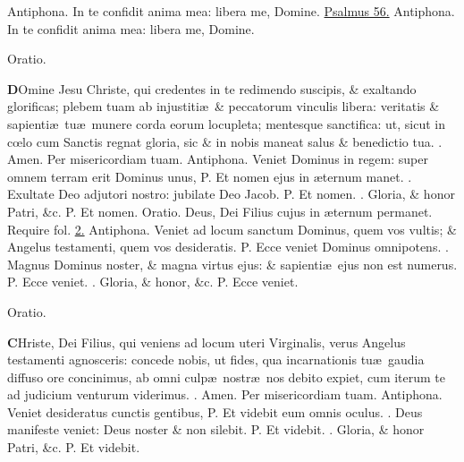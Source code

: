 \documentclass[letter,11pt]{book}
\makeatletter
\DeclareRobustCommand{\Vbar}{\vers@resp{-0.1em}{V}}
\DeclareRobustCommand{\Rbar}{\vers@resp{0pt}{R}}
\newcommand{\vers@resp@sym}{\raisebox{0.2ex}{\rotatebox[origin=c]{-20}{$\m@th\rceil$}}}
\newcommand{\vers@resp}[2]{%
  {\ooalign{\hidewidth\kern#1\vers@resp@sym\hidewidth\cr#2\cr}}%
}%
\def\P{\color{Red} P. \color{black}}
\def\V{\color{Red} \Vbar . \color{black}}
\def\R{\color{Red} \Rbar . \color{black}}
\makeatother
\begin{document}
\begin{multicols}{2}
\newline \color{Red} Antiphona. \color{black} In te confidit anima mea: libera me, Domine. \color{Red} \hyperlink{ps56}{Psalmus 56.} \color{black}
\newline \color{Red} Antiphona. \color{black} In te confidit anima mea: libera me, Domine.
\vspace{-.75em} \begin{center} \color{Red} Oratio. \end{center} \vspace{-.5em}
\lettrine[lines=2]{\bfseries \color{Red} D}{}Omine Jesu Christe, qui credentes in te redimendo suscipis, \& exaltando glorificas; plebem tuam ab injustiti\ae \ \& peccatorum vinculis libera: veritatis \& sapienti\ae \ tu\ae \ munere corda eorum locupleta; mentesque sanctifica: ut, sicut in c\oe lo cum Sanctis regnat gloria, sic \& in nobis maneat salus \& benedictio tua. \R Amen. Per misericordiam tuam.
\newline \color{Red} Antiphona. \color{black} Veniet Dominus in regem: super omnem terram erit Dominus unus, \P Et nomen ejus in \ae ternum manet. \V Exultate Deo adjutori nostro: jubilate Deo Jacob. \P Et nomen. \V Gloria, \& honor Patri, \&c. \P Et nomen.
\newline \color{Red} Oratio. \color{black} Deus, Dei Filius cujus in \ae ternum permanet. \color{Red} Require fol. \color{black} \hyperlink{page.2}{2.}
\newline \color{Red} Antiphona. \color{black} Veniet ad locum sanctum Dominus, quem vos vultis; \& Angelus testamenti, quem vos desideratis. \P Ecce veniet Dominus omnipotens. \V Magnus Dominus noster, \& magna virtus ejus: \& sapienti\ae \ ejus non est numerus. \P Ecce veniet. \V Gloria, \& honor, \&c. \P Ecce veniet.
\vspace{+.25em} \begin{center} \color{Red} Oratio. \end{center} \vspace{-.75em}
\lettrine[lines=2]{\bfseries \color{Red} C}{}Hriste, Dei Filius, qui veniens ad locum uteri Virginalis, verus Angelus testamenti agnosceris: concede nobis, ut fides, qua incarnationis tu\ae \ gaudia diffuso ore concinimus, ab omni culp\ae \ nostr\ae \ nos debito expiet, cum iterum te ad judicium venturum viderimus. \R Amen. Per misericordiam tuam.
\newline \color{Red} Antiphona. \color{black} Veniet desideratus cunctis gentibus, \P Et videbit eum omnis oculus. \V Deus manifeste veniet: Deus noster \& non silebit. \P Et videbit. \V Gloria, \& honor Patri, \&c. \P Et videbit.

\end{multicols}
\end{document}
